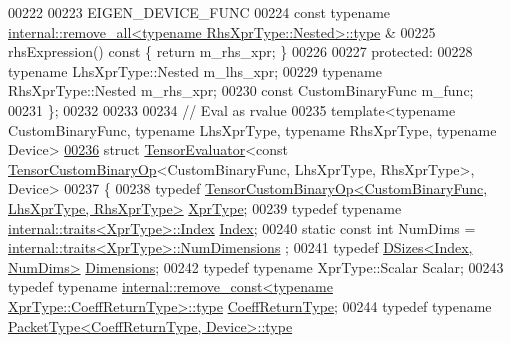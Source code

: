 \begin{DoxyCode}
00222 
00223   EIGEN\_DEVICE\_FUNC
00224   \textcolor{keyword}{const} \textcolor{keyword}{typename} \hyperlink{group___sparse_core___module}{internal::remove\_all<typename RhsXprType::Nested>::type}
      &
00225   rhsExpression()\textcolor{keyword}{ const }\{ \textcolor{keywordflow}{return} m\_rhs\_xpr; \}
00226 
00227   \textcolor{keyword}{protected}:
00228     \textcolor{keyword}{typename} LhsXprType::Nested m\_lhs\_xpr;
00229     \textcolor{keyword}{typename} RhsXprType::Nested m\_rhs\_xpr;
00230     \textcolor{keyword}{const} CustomBinaryFunc m\_func;
00231 \};
00232 
00233 
00234 \textcolor{comment}{// Eval as rvalue}
00235 \textcolor{keyword}{template}<\textcolor{keyword}{typename} CustomBinaryFunc, \textcolor{keyword}{typename} LhsXprType, \textcolor{keyword}{typename} RhsXprType, \textcolor{keyword}{typename} Device>
\hyperlink{struct_eigen_1_1_tensor_evaluator_3_01const_01_tensor_custom_binary_op_3_01_custom_binary_func_0fea6836b993af318b6a5ab54d775368f}{00236} \textcolor{keyword}{struct }\hyperlink{struct_eigen_1_1_tensor_evaluator}{TensorEvaluator}<const \hyperlink{class_eigen_1_1_tensor_custom_binary_op}{TensorCustomBinaryOp}<CustomBinaryFunc, 
      LhsXprType, RhsXprType>, Device>
00237 \{
00238   \textcolor{keyword}{typedef} \hyperlink{class_eigen_1_1_tensor_custom_binary_op}{TensorCustomBinaryOp<CustomBinaryFunc, LhsXprType, RhsXprType>}
       \hyperlink{class_eigen_1_1_tensor_custom_binary_op}{XprType};
00239   \textcolor{keyword}{typedef} \textcolor{keyword}{typename} \hyperlink{struct_eigen_1_1internal_1_1traits}{internal::traits<XprType>::Index} 
      \hyperlink{namespace_eigen_a62e77e0933482dafde8fe197d9a2cfde}{Index};
00240   \textcolor{keyword}{static} \textcolor{keyword}{const} \textcolor{keywordtype}{int} NumDims = \hyperlink{struct_eigen_1_1internal_1_1traits}{internal::traits<XprType>::NumDimensions}
      ;
00241   \textcolor{keyword}{typedef} \hyperlink{struct_eigen_1_1_d_sizes}{DSizes<Index, NumDims>} \hyperlink{struct_eigen_1_1_d_sizes}{Dimensions};
00242   \textcolor{keyword}{typedef} \textcolor{keyword}{typename} XprType::Scalar Scalar;
00243   \textcolor{keyword}{typedef} \textcolor{keyword}{typename} 
      \hyperlink{group___sparse_core___module}{internal::remove\_const<typename XprType::CoeffReturnType>::type}
       \hyperlink{group___sparse_core___module}{CoeffReturnType};
00244   \textcolor{keyword}{typedef} \textcolor{keyword}{typename} \hyperlink{group___sparse_core___module}{PacketType<CoeffReturnType, Device>::type} 

\end{DoxyCode}
